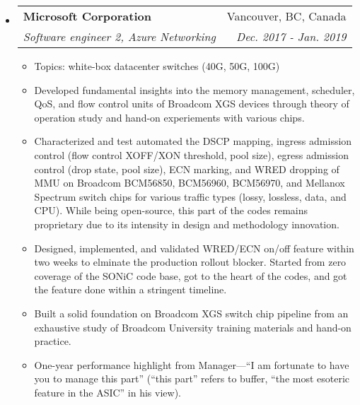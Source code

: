 \documentclass[letterpaper,11pt]{article}
\makeatletter
\newcommand{\ressubheading}[4]{
\begin{tabular*}{6.69in}{l@{\extracolsep{\fill}}r}
        \textbf{#1} & #2 \\
        \textit{#3} & \textit{#4} \\
\end{tabular*}\vspace{-6pt}
}
\newcommand{\resitem}[1]{\item #1 \vspace{-2pt}}
\makeatother
\begin{document}
\begin{itemize}
\item
  \ressubheading{Microsoft Corporation}{Vancouver, BC, Canada}
  {Software engineer 2, Azure Networking}{Dec. 2017 - Jan. 2019}
  \begin{itemize}
  \resitem{Topics: white-box datacenter switches (40G, 50G, 100G)}
  \resitem{Developed fundamental insights into the memory management, scheduler, QoS, and flow control units of Broadcom XGS devices
  through theory of operation study and hand-on experiements with various chips.}
  \resitem{Characterized and test automated the DSCP mapping, ingress admission control (flow control XOFF/XON threshold, pool size),
  egress admission control (drop state, pool size), ECN marking, and WRED dropping of MMU
  on Broadcom BCM56850, BCM56960, BCM56970, and Mellanox Spectrum switch chips
  for various traffic types (lossy, lossless, data, and CPU).
  While being open-source, this part of the codes remains proprietary due to its intensity in design and methodology innovation.}
  \resitem{Designed, implemented, and validated WRED/ECN on/off feature within two weeks to elminate the production rollout blocker.
  Started from zero coverage of the SONiC code base, got to the heart of the codes, and got the feature done within a stringent timeline.}
  \resitem{Built a solid foundation on Broadcom XGS switch chip pipeline from an exhaustive study of Broadcom University training materials
  and hand-on practice.}
  \resitem{One-year performance highlight from Manager---``I am fortunate to have you to manage this part''
  (``this part'' refers to buffer, ``the most esoteric feature in the ASIC'' in his view).}
  \end{itemize}


\end{itemize}
\end{document}
